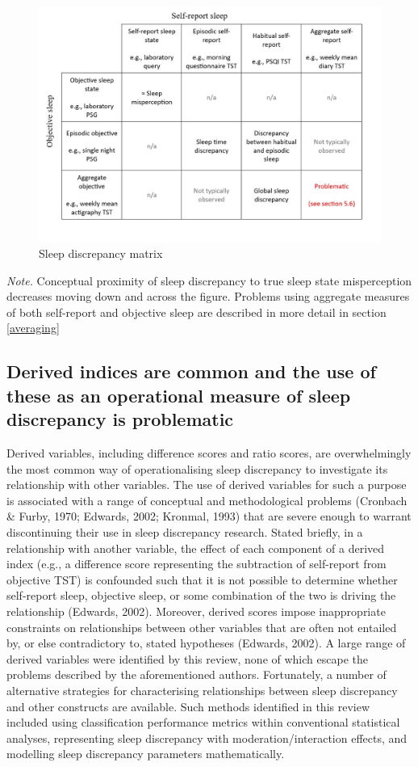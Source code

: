 \documentclass[
]{article}
\begin{document}
\begin{figure}
\centering
\includegraphics{matrix.jpg}
\caption{\label{fig:subtypes}Sleep discrepancy matrix}
\end{figure}

\emph{Note.} Conceptual proximity of sleep discrepancy to true sleep state misperception decreases moving down and across the figure. Problems using aggregate measures of both self-report and objective sleep are described in more detail in section \ref{averaging}

\subsection{Derived indices are common and the use of these as an operational measure of sleep discrepancy is problematic}\label{dvar}

Derived variables, including difference scores and ratio scores, are overwhelmingly the most common way of operationalising sleep discrepancy to investigate its relationship with other variables. The use of derived variables for such a purpose is associated with a range of conceptual and methodological problems (Cronbach \& Furby, 1970; Edwards, 2002; Kronmal, 1993) that are severe enough to warrant discontinuing their use in sleep discrepancy research. Stated briefly, in a relationship with another variable, the effect of each component of a derived index (e.g., a difference score representing the subtraction of self-report from objective TST) is confounded such that it is not possible to determine whether self-report sleep, objective sleep, or some combination of the two is driving the relationship (Edwards, 2002). Moreover, derived scores impose inappropriate constraints on relationships between other variables that are often not entailed by, or else contradictory to, stated hypotheses (Edwards, 2002). A large range of derived variables were identified by this review, none of which escape the problems described by the aforementioned authors. Fortunately, a number of alternative strategies for characterising relationships between sleep discrepancy and other constructs are available. Such methods identified in this review included using classification performance metrics within conventional statistical analyses, representing sleep discrepancy with moderation/interaction effects, and modelling sleep discrepancy parameters mathematically.
\end{document}
